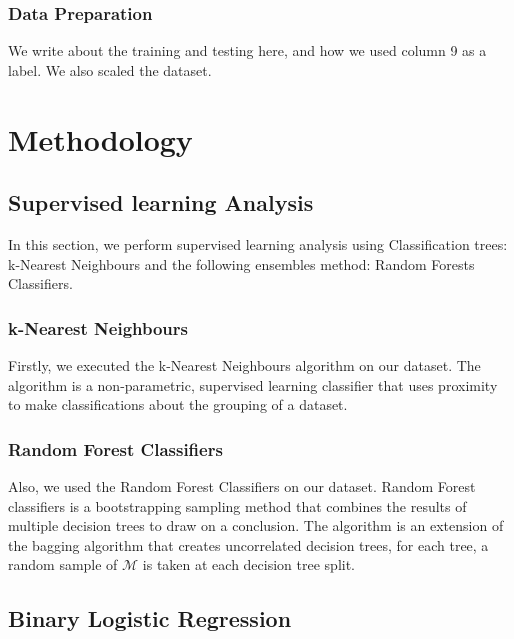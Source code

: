 \documentclass[12pt]{article}
\begin{document}
\subsubsection{Data Preparation} 

We write about the training and testing here, and how we used column 9 as a label. We also scaled the dataset.\\

\section{Methodology}
\subsection{Supervised learning Analysis} 
 In this section, we perform supervised learning analysis using Classification trees: k-Nearest Neighbours and the following ensembles method: Random Forests Classifiers.\cite{zhou2012ensemble}
 
 \subsubsection{k-Nearest Neighbours}

 Firstly, we executed the k-Nearest Neighbours algorithm \cite{peterson2009k} on our dataset. The algorithm is a non-parametric, supervised learning classifier that uses proximity to make classifications about the grouping of a dataset.

 \subsubsection{Random Forest Classifiers}
 
 Also, we used the Random Forest Classifiers \cite{zhou2012ensemble} on our dataset. Random Forest classifiers is a bootstrapping sampling method that combines the results of multiple decision trees to draw on a conclusion. The algorithm \cite{Lecture16} is an extension of the bagging algorithm \cite{Lecture16} that creates uncorrelated decision trees, for each tree, a random sample of $\mathcal{M}$ is taken at each decision tree split.

\subsection{Binary Logistic Regression}
\end{document}
